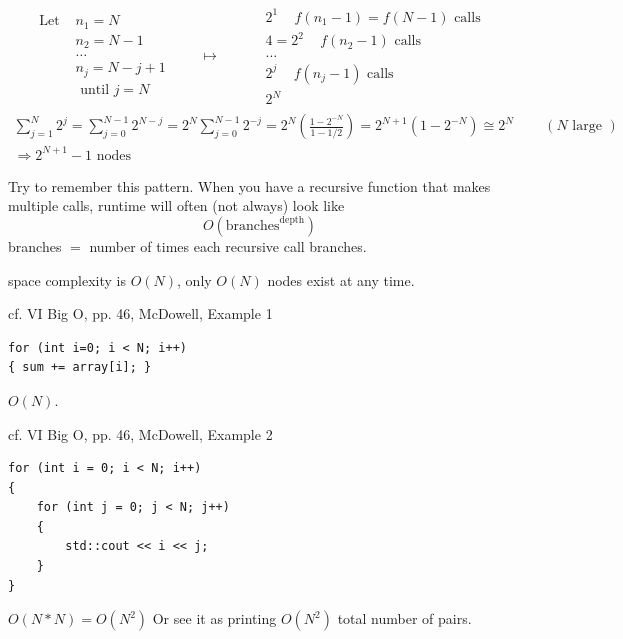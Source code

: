 \documentclass[10pt]{amsart}
\begin{document}
\begin{multicols*}{2}
\[
\begin{gathered}
	\begin{aligned}
	\text{ Let } & n_1 = N \\
	& n_2 = N - 1 \\
	& \dots  \\
	& n_j = N - j + 1 \\
	& \text{ until } j = N 
	\end{aligned} \qquad \mapsto \qquad 
	\begin{aligned}
	& 2^1 \quad \, f(n_1 - 1) = f(N-1) \text{ calls } \\ 
	& 4 = 2^2 \quad \, f(n_2- 1) \text{ calls }  \\
	& \dots \\
	& 2^j \quad \, f(n_j - 1) \text{ calls }  \\
	& 2^N 
	\end{aligned}
\end{gathered}
\]
\[
\begin{gathered}
	\sum_{j=1}^N 2^j = \sum_{j=0}^{N-1} 2^{N-j} = 2^N \sum_{j=0}^{N-1} 2^{-j} = 2^N \left(\frac{ 1 - 2^{-N} }{ 1 - 1/2} \right) = 2^{N+1} (1- 2^{-N}) \cong 2^N \qquad \, (N \text{ large }) \\ 
 \Longrightarrow 2^{N+1} -1 \text{ nodes } 
\end{gathered}
\]

Try to remember this pattern. When you have a recursive function that makes multiple calls, runtime will often (not always) look like
\begin{equation}
	\boxed{ O(\text{branches}^{\text{depth}}) }
\end{equation}
branches $=$ number of times each recursive call branches.

space complexity is $O(N)$, only $O(N)$ nodes exist at any time.

cf. VI Big O, pp. 46, McDowell, Example 1

\begin{verbatim}
for (int i=0; i < N; i++)
{ sum += array[i]; }
\end{verbatim}
$O(N)$.

cf. VI Big O, pp. 46, McDowell, Example 2

\begin{verbatim}
for (int i = 0; i < N; i++)
{
	for (int j = 0; j < N; j++)
	{
		std::cout << i << j;
	}
}
\end{verbatim}

$O(N*N)= O(N^2)$ Or see it as printing $O(N^2)$ total number of pairs.


\end{multicols*}
\end{document}

